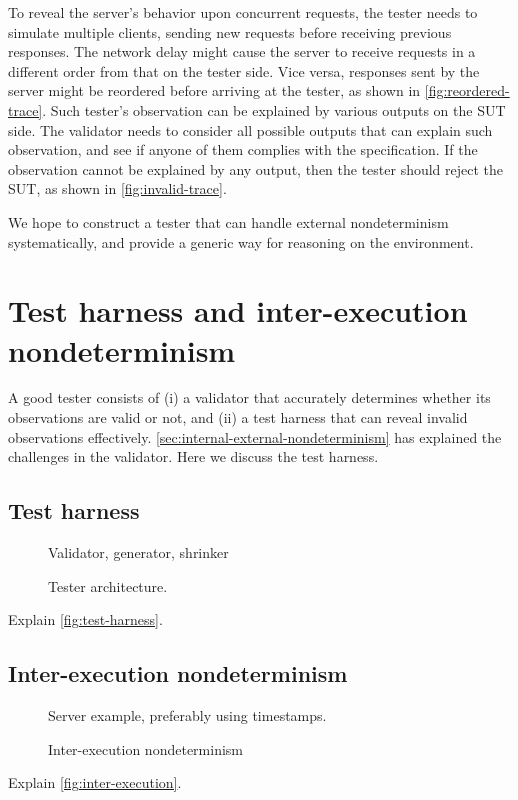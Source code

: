 To reveal the server's behavior upon concurrent requests, the tester needs to
simulate multiple clients, sending new requests before receiving previous
responses.  The network delay might cause the server to receive requests in a
different order from that on the tester side.  Vice versa, responses sent by the
server might be reordered before arriving at the tester, as shown in
\autoref{fig:reordered-trace}.  Such tester's observation can be explained by
various outputs on the SUT side.  The validator needs to consider all possible
outputs that can explain such observation, and see if anyone of them complies
with the specification.  If the observation cannot be explained by any output,
then the tester should reject the SUT, as shown in \autoref{fig:invalid-trace}.

We hope to construct a tester that can handle external nondeterminism
systematically, and provide a generic way for reasoning on the environment.

\section{Test harness and inter-execution nondeterminism}
\label{sec:inter-execution-nondeterminism}
A good tester consists of (i) a validator that accurately determines whether its
observations are valid or not, and (ii) a test harness that can reveal invalid
observations effectively.  \autoref{sec:internal-external-nondeterminism} has
explained the challenges in the validator.  Here we discuss the test harness.

\subsection{Test harness}
\begin{figure}
  Validator, generator, shrinker
  \caption{Tester architecture.}
  \label{fig:test-harness}
\end{figure}
Explain \autoref{fig:test-harness}.

\subsection{Inter-execution nondeterminism}
\begin{figure}
  Server example, preferably using timestamps.
  \caption{Inter-execution nondeterminism}
  \label{fig:inter-execution}
\end{figure}
Explain \autoref{fig:inter-execution}.



